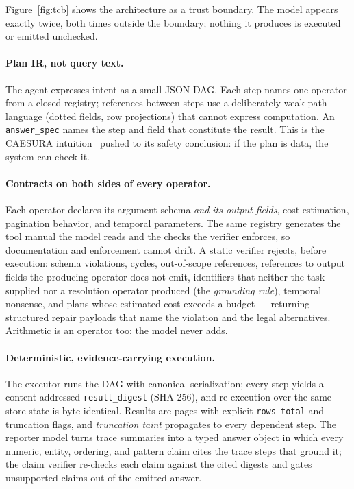 \documentclass[sigconf]{acmart}
\begin{document}
Figure~\ref{fig:tcb} shows the architecture as a trust boundary. The
model appears exactly twice, both times outside the boundary; nothing it
produces is executed or emitted unchecked.

\paragraph{Plan IR, not query text.}
The agent expresses intent as a small JSON DAG. Each step names one
operator from a closed registry; references between steps use a
deliberately weak path language (dotted fields, row projections) that
cannot express computation. An \texttt{answer\_spec} names the step and
field that constitute the result. This is the CAESURA
intuition~\cite{urban2024caesura} pushed to its safety conclusion: if
the plan is data, the system can check it.

\paragraph{Contracts on both sides of every operator.}
Each operator declares its argument schema \emph{and its output fields},
cost estimation, pagination behavior, and temporal parameters. The same
registry generates the tool manual the model reads and the checks the
verifier enforces, so documentation and enforcement cannot drift. A
static verifier rejects, before execution: schema violations, cycles,
out-of-scope references, references to output fields the producing
operator does not emit, identifiers that neither the task supplied nor a
resolution operator produced (the \emph{grounding rule}), temporal
nonsense, and plans whose estimated cost exceeds a budget --- returning
structured repair payloads that name the violation and the legal
alternatives. Arithmetic is an operator too: the model never adds.

\paragraph{Deterministic, evidence-carrying execution.}
The executor runs the DAG with canonical serialization; every step
yields a content-addressed \texttt{result\_digest} (SHA-256), and
re-execution over the same store state is byte-identical. Results are pages with explicit
\texttt{rows\_total} and truncation flags, and \emph{truncation taint}
propagates to every dependent step. The reporter model turns trace
summaries into a typed answer object in which every numeric, entity,
ordering, and pattern claim cites the trace steps that ground it; the
claim verifier re-checks each claim against the cited digests and gates
unsupported claims out of the emitted answer.
\end{document}
